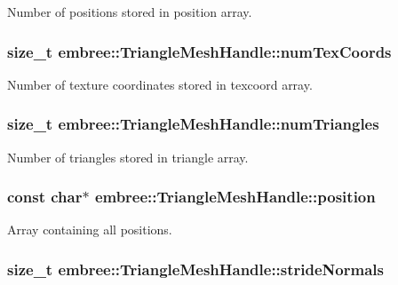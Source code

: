 Number of positions stored in position array. 

\hypertarget{classembree_1_1_triangle_mesh_handle_abfad906cd249332f6811fe00add43738}{
\subsubsection[{numTexCoords}]{\setlength{\rightskip}{0pt plus 5cm}size\_\-t {\bf embree::TriangleMeshHandle::numTexCoords}}}
\label{classembree_1_1_triangle_mesh_handle_abfad906cd249332f6811fe00add43738}


Number of texture coordinates stored in texcoord array. 

\hypertarget{classembree_1_1_triangle_mesh_handle_a6933547b0ae57a6a1661218cfe2050c1}{
\subsubsection[{numTriangles}]{\setlength{\rightskip}{0pt plus 5cm}size\_\-t {\bf embree::TriangleMeshHandle::numTriangles}}}
\label{classembree_1_1_triangle_mesh_handle_a6933547b0ae57a6a1661218cfe2050c1}


Number of triangles stored in triangle array. 

\hypertarget{classembree_1_1_triangle_mesh_handle_abb14d6b2d49813d44cc7d6a65bcc7590}{
\subsubsection[{position}]{\setlength{\rightskip}{0pt plus 5cm}const char$\ast$ {\bf embree::TriangleMeshHandle::position}}}
\label{classembree_1_1_triangle_mesh_handle_abb14d6b2d49813d44cc7d6a65bcc7590}


Array containing all positions. 

\hypertarget{classembree_1_1_triangle_mesh_handle_a57f7f38b30a0fca87239967894d3bf07}{
\subsubsection[{strideNormals}]{\setlength{\rightskip}{0pt plus 5cm}size\_\-t {\bf embree::TriangleMeshHandle::strideNormals}}}
\label{classembree_1_1_triangle_mesh_handle_a57f7f38b30a0fca87239967894d3bf07}



